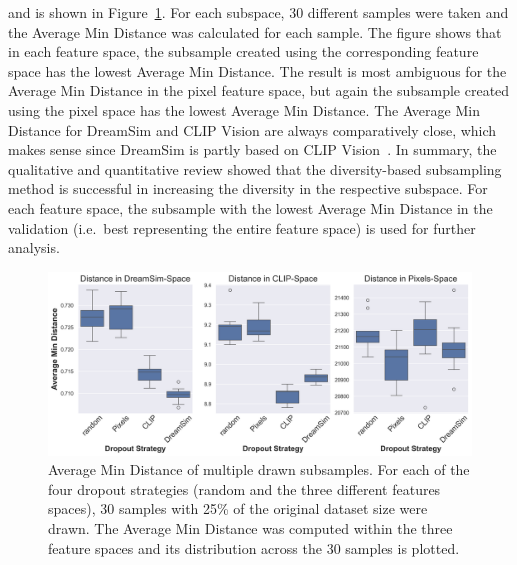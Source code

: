 and is shown in Figure~\ref{fig:dropout_avg_min_distance}. For each subspace, 30 different samples were taken and the Average Min Distance was calculated for each sample. The figure shows that in each feature space, the subsample created using the corresponding feature space has the lowest Average Min Distance. The result is most ambiguous for the Average Min Distance in the pixel feature space, but again the subsample created using the pixel space has the lowest Average Min Distance. The Average Min Distance for DreamSim and CLIP Vision are always comparatively close, which makes sense since DreamSim is partly based on CLIP Vision~\cite{fuDreamSimLearningNew2023}. In summary, the qualitative and quantitative review showed that the diversity-based subsampling method is successful in increasing the diversity in the respective subspace. For each feature space, the subsample with the lowest Average Min Distance in the validation (i.e.\ best representing the entire feature space) is used for further analysis.

\begin{figure}[ht]
  \centering
  \includegraphics[width=1\textwidth]{plots/dropout_avg_min_distance.png}
  \caption[Average Min Distance with different dropout strategies]{Average Min Distance of multiple drawn subsamples. For each of the four dropout strategies (random and the three different features spaces), 30 samples with 25\% of the original dataset size were drawn. The Average Min Distance was computed within the three feature spaces and its distribution across the 30 samples is plotted.}\label{fig:dropout_avg_min_distance}
\end{figure}



